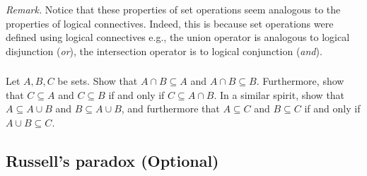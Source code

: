 \documentclass{amsart}
\theoremstyle{definition}
\begin{document}
\textit{Remark.} Notice that these properties of set operations seem analogous to the properties of logical connectives. Indeed, this is because set operations were defined using logical connectives e.g., the union operator is analogous to logical disjunction (\textit{or}), the intersection operator is to logical conjunction (\textit{and}). \\

\subsubsection{} Let $A,B,C$ be sets. Show that $A\cap B\subseteq A$ and $A\cap B\subseteq B$. Furthermore, show that $C\subseteq A$ and $C\subseteq B$ if and only if $C\subseteq A\cap B$. In a similar spirit, show that $A\subseteq A\cup B$ and $B\subseteq A\cup B$, and furthermore that $A\subseteq C$ and $B\subseteq C$ if and only if $A\cup B\subseteq C$. 





\subsection{Russell's paradox (Optional)} 
\end{document}
